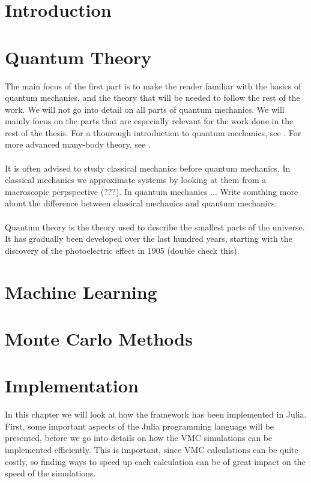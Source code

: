 \documentclass[english]{article}
\begin{document}
	
    
    \part{Introduction}
    
    
    \part{Quantum Theory} \label{part:quantumtheory}
    The main focus of the first part is to make the reader familiar with the basics of quantum mechanics, and the theory that will be needed to follow the rest of the work. We will not go into detail on all parts of quantum mechanics. We will mainly focus on the parts that are especially relevant for the work done in the rest of the thesis. For a thourough introduction to quantum mechanics, see \cite{}. For more advanced many-body theory, see \cite{}. 
    \\
    \\
    It is often advised to study classical mechanics before quantum mechanics. In classical mechanics we approximate systems by looking at them from a macroscopic perpspective (???). In quantum mechanics ... Write somthing more about the difference between classical mechanics and quantum mechanics. 
    \\
    \\
    Quantum theory is the theory used to describe the smallest parts of the universe. It has gradually been developed over the last hundred years, starting with the discovery of the photoelectric effect in 1905 (double check this). 
    
    
    \part{Machine Learning} 
    \label{part:machinelearningtheory}
    
    
    \part{Monte Carlo Methods} \label{part:methods}
    
    
    
    \part{Implementation} \label{part:implementation}
    In this chapter we will look at how the framework has been implemented in Julia. First, some important aspects of the Julia programming language will be presented, before we go into details on how the VMC simulations can be implemented efficiently. This is important, since VMC calculations can be quite costly, so finding ways to speed up each calculation can be of great impact on the speed of the simulations. 
    
    
\end{document}
